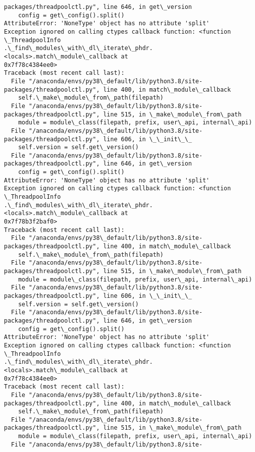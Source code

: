 \documentclass[11pt]{article}
\begin{document}
\begin{Verbatim}[commandchars=\\\{\}]
packages/threadpoolctl.py", line 646, in get\_version
    config = get\_config().split()
AttributeError: 'NoneType' object has no attribute 'split'
Exception ignored on calling ctypes callback function: <function \_ThreadpoolInfo
.\_find\_modules\_with\_dl\_iterate\_phdr.<locals>.match\_module\_callback at
0x7f78c4384ee0>
Traceback (most recent call last):
  File "/anaconda/envs/py38\_default/lib/python3.8/site-
packages/threadpoolctl.py", line 400, in match\_module\_callback
    self.\_make\_module\_from\_path(filepath)
  File "/anaconda/envs/py38\_default/lib/python3.8/site-
packages/threadpoolctl.py", line 515, in \_make\_module\_from\_path
    module = module\_class(filepath, prefix, user\_api, internal\_api)
  File "/anaconda/envs/py38\_default/lib/python3.8/site-
packages/threadpoolctl.py", line 606, in \_\_init\_\_
    self.version = self.get\_version()
  File "/anaconda/envs/py38\_default/lib/python3.8/site-
packages/threadpoolctl.py", line 646, in get\_version
    config = get\_config().split()
AttributeError: 'NoneType' object has no attribute 'split'
Exception ignored on calling ctypes callback function: <function \_ThreadpoolInfo
.\_find\_modules\_with\_dl\_iterate\_phdr.<locals>.match\_module\_callback at
0x7f78b3f2baf0>
Traceback (most recent call last):
  File "/anaconda/envs/py38\_default/lib/python3.8/site-
packages/threadpoolctl.py", line 400, in match\_module\_callback
    self.\_make\_module\_from\_path(filepath)
  File "/anaconda/envs/py38\_default/lib/python3.8/site-
packages/threadpoolctl.py", line 515, in \_make\_module\_from\_path
    module = module\_class(filepath, prefix, user\_api, internal\_api)
  File "/anaconda/envs/py38\_default/lib/python3.8/site-
packages/threadpoolctl.py", line 606, in \_\_init\_\_
    self.version = self.get\_version()
  File "/anaconda/envs/py38\_default/lib/python3.8/site-
packages/threadpoolctl.py", line 646, in get\_version
    config = get\_config().split()
AttributeError: 'NoneType' object has no attribute 'split'
Exception ignored on calling ctypes callback function: <function \_ThreadpoolInfo
.\_find\_modules\_with\_dl\_iterate\_phdr.<locals>.match\_module\_callback at
0x7f78c4384ee0>
Traceback (most recent call last):
  File "/anaconda/envs/py38\_default/lib/python3.8/site-
packages/threadpoolctl.py", line 400, in match\_module\_callback
    self.\_make\_module\_from\_path(filepath)
  File "/anaconda/envs/py38\_default/lib/python3.8/site-
packages/threadpoolctl.py", line 515, in \_make\_module\_from\_path
    module = module\_class(filepath, prefix, user\_api, internal\_api)
  File "/anaconda/envs/py38\_default/lib/python3.8/site-

\end{Verbatim}
\end{document}

